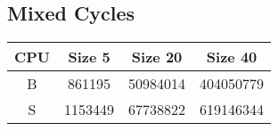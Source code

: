 \subsection{Mixed Cycles}
\begin{center}
        \begin{tabular}{c c c c}
            \hline
            CPU & Size 5 & Size 20 & Size 40 \\
            \hline
            B & 861195 & 50984014 & 404050779 \\
            \hline
            S & 1153449 & 67738822 & 619146344 \\
            \hline
        \end{tabular}
\end{center}